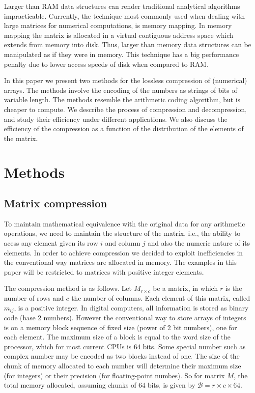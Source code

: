\documentclass[10pt]{article}
\begin{document}
Larger than RAM data structures can render traditional analytical algorithms impracticable. Currently, the technique most commonly used when dealing with large matrices for numerical computations, is memory mapping\cite{van2011numpy,big}. In memory mapping the matrix is allocated in a virtual contiguous address space which extends from memory into disk. Thus, larger than memory data structures can be manipulated as if they were in memory.  This technique has a big performance penalty due to lower access speeds of disk when compared to RAM. 

In this paper we present two methods for the lossless compression of (numerical) arrays. The methods involve the encoding of the numbers as strings of bits of variable length. The methods resemble the arithmetic coding\cite{bodden2007arithmetic} algorithm, but is cheaper to compute. We describe the process of compression and decompression, and study their efficiency under different applications. We also discuss the efficiency of the compression as a function of the distribution of the elements of the matrix. 

\section*{Methods}

\subsection*{Matrix compression}

To maintain mathematical equivalence with the original data for any arithmetic operations, we need to  maintain the structure of the matrix, i.e., the ability to acess any element given its row $i$ and column $j$ and also the numeric nature of its elements. In order to achieve compression we decided to exploit inefficiencies in the conventional way matrices are allocated in memory. The examples in this paper will be restricted to matrices with positive integer elements.

The compression method is as follows. Let $M_{r \times c}$ be a matrix, in which $r$ is the number of rows and $c$ the number of columns. Each element of this matrix, called $m_{ij}$, is a positive integer. In digital computers, all information is stored as binary code (base 2 numbers). However the conventional way to store arrays of integers is on a memory block sequence of fixed size (power of 2 bit numbers), one for each element. The maximum size of a block is equal to the word size of the processor, which for most current CPUs is 64 bits. Some special number such as complex number may be encoded as two blocks instead of one. The size of the chunk of memory allocated to each number will determine their maximum  size (for integers) or their precision (for floating-point numbes). So for matrix $M$, the total memory allocated, assuming chunks of 64 bits, is given by $\mathcal{B} = r \times c \times 64$.
\end{document}
